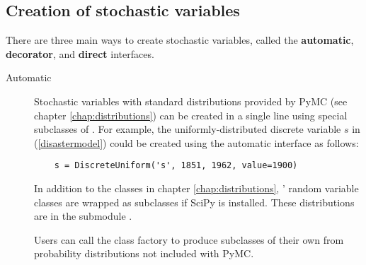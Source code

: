 \subsection{Creation of stochastic variables}
There are three main ways to create stochastic variables, called the \textbf{automatic}, \textbf{decorator}, and \textbf{direct} interfaces.

\begin{description}    
    \item[Automatic] Stochastic variables with standard distributions provided by PyMC (see chapter \ref{chap:distributions}) can be created in a single line using special subclasses of . For example, the uniformly-distributed discrete variable $s$ in (\ref{disastermodel}) could be created using the automatic interface as follows:
\begin{verbatim}
    s = DiscreteUniform('s', 1851, 1962, value=1900)
\end{verbatim}

    In addition to the classes in chapter \ref{chap:distributions}, ' random variable classes are wrapped as  subclasses if SciPy is installed. These distributions are in the submodule .

    Users can call the class factory  to produce  subclasses of their own from probability distributions not included with PyMC.%
    

\end{description}
